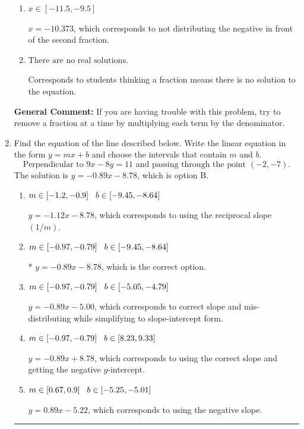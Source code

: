 \documentclass{extbook}[14pt]
\newcommand{\litem}[1]{\item #1

\rule{\textwidth}{0.4pt}}
\begin{document}
\begin{enumerate}
{\begin{enumerate}[label=\Alph*.]
 $x = -6.176$, which corresponds to dividing the coefficients in front of x by the denominator rather than dividing BOTH parts of the numerator by the denominator (or removing the fractions through multiplication).
\item \( x \in [-11.5, -9.5] \)

 $x = -10.373$, which corresponds to not distributing the negative in front of the second fraction.
\item \( \text{There are no real solutions.} \)

Corresponds to students thinking a fraction means there is no solution to the equation.
\end{enumerate}

\textbf{General Comment:} If you are having trouble with this problem, try to remove a fraction at a time by multiplying each term by the denominator.
}
\litem{
Find the equation of the line described below. Write the linear equation in the form $ y=mx+b $ and choose the intervals that contain $m$ and $b$.
\[ \text{Perpendicular to } 9 x - 8 y = 11 \text{ and passing through the point } (-2, -7). \]The solution is \( y = -0.89x - 8.78 \), which is option B.\begin{enumerate}[label=\Alph*.]
\item \( m \in [-1.2, -0.9] \hspace*{3mm} b \in [-9.45, -8.64] \)

 $y = -1.12x - 8.78$, which corresponds to using the reciprocal slope $(1/m)$.
\item \( m \in [-0.97, -0.79] \hspace*{3mm} b \in [-9.45, -8.64] \)

* $y = -0.89x - 8.78$, which is the correct option.
\item \( m \in [-0.97, -0.79] \hspace*{3mm} b \in [-5.05, -4.79] \)

 $y = -0.89x - 5.00$, which corresponds to correct slope and mis-distributing while simplifying to slope-intercept form.
\item \( m \in [-0.97, -0.79] \hspace*{3mm} b \in [8.23, 9.33] \)

 $y = -0.89x + 8.78$, which corresponds to using the correct slope and getting the negative $y$-intercept.
\item \( m \in [0.67, 0.9] \hspace*{3mm} b \in [-5.25, -5.01] \)

 $y = 0.89x - 5.22$, which corresponds to using the negative slope.
\end{enumerate}

}
\end{enumerate}
\end{document}
